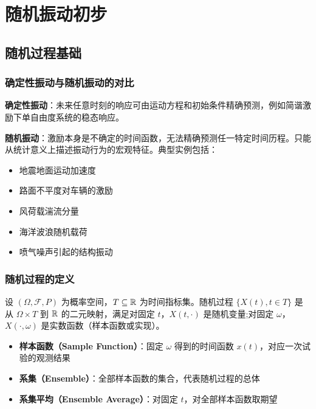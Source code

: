 \chapter{随机振动初步}

\section{随机过程基础}
\subsection{确定性振动与随机振动的对比}
\textbf{确定性振动}：未来任意时刻的响应可由运动方程和初始条件精确预测，例如简谐激励下单自由度系统的稳态响应。

\textbf{随机振动}：激励本身是不确定的时间函数，无法精确预测任一特定时间历程。只能从统计意义上描述振动行为的宏观特征。典型实例包括：
\begin{itemize}
    \item 地震地面运动加速度
    \item 路面不平度对车辆的激励
    \item 风荷载湍流分量
    \item 海洋波浪随机载荷
    \item 喷气噪声引起的结构振动
\end{itemize}

\subsection{随机过程的定义}
\begin{definition}[随机过程]
设 $(\Omega, \mathcal{F}, P)$ 为概率空间，$T \subseteq \mathbb{R}$ 为时间指标集。随机过程 $\{X(t), t \in T\}$ 是从 $\Omega \times T$ 到 $\mathbb{R}$ 的二元映射，满足对固定 $t$，$X(t, \cdot)$ 是随机变量;对固定 $\omega$，$X(\cdot, \omega)$ 是实数函数（样本函数或实现）。
\end{definition}

\begin{itemize}
    \item \textbf{样本函数（Sample Function）}：固定 $\omega$ 得到的时间函数 $x(t)$，对应一次试验的观测结果
    \item \textbf{系集（Ensemble）}：全部样本函数的集合，代表随机过程的总体
    \item \textbf{系集平均（Ensemble Average）}：对固定 $t$，对全部样本函数取期望
\end{itemize}

